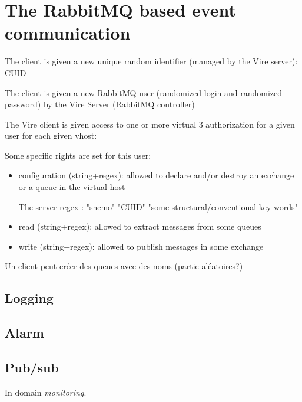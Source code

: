 
\section{The RabbitMQ based event communication}\label{app:rabbitmq_event}

The client is given a new unique random identifier (managed by the Vire server):
CUID

The client is given a new RabbitMQ user
(randomized login and randomized password)
by the Vire Server (RabbitMQ controller)

The Vire client is given access to one or more virtual
3 authorization for a given user for each given vhost:

Some specific rights are set for this user:

\begin{itemize}
\item configuration (string+regex): allowed to declare and/or destroy an exchange or a queue in the virtual host

The server regex : "snemo" "CUID" "some structural/conventional  key words"

\item read (string+regex): allowed to extract messages from some queues


\item write (string+regex): allowed to publish messages in some exchange



\end{itemize}

Un client peut créer des queues avec des noms (partie aléatoires?)


\subsection{Logging}\label{app:rabbitmq_event:logging}




\subsection{Alarm}\label{app:rabbitmq_event:alarm}



\subsection{Pub/sub}\label{app:rabbitmq_event:pubsub}

In domain \emph{monitoring}.

